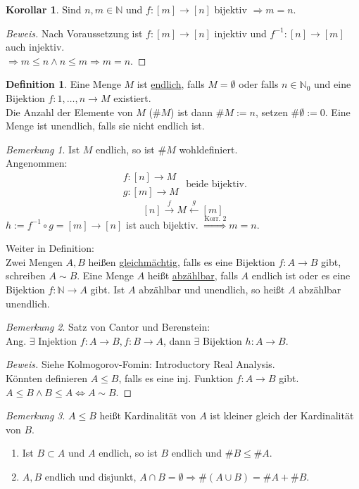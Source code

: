 \documentclass[12pt,a4paper,titlepage]{article} %
\theoremstyle{definition}
\newtheorem{kor}[satz]{Korollar}
\newtheorem{defi}[satz]{Definition}
\theoremstyle{remark}
\newtheorem*{bem}{Bemerkung}
\newenvironment{bew}{\begin{proof}[Beweis]}{\end{proof}}
\begin{document}
\begin{kor}
	Sind $n,m\in\mathbb{N}$ und $f:[m]\rightarrow[n]$ bijektiv $\Rightarrow m=n$.
\end{kor}
\begin{bew}
	Nach Voraussetzung ist $f: [m]\rightarrow[n]$ injektiv und $f^{-1}:[n]\rightarrow[m]$ auch injektiv.\\
	$\Rightarrow m\leq n \wedge n \leq m \Rightarrow m = n$.
\end{bew}
\begin{defi}
	Eine Menge $M$ ist \underline{endlich}, falls $M=\emptyset$ oder falls $n\in\mathbb{N}_0$ und eine Bijektion $f:{1,\ldots,n}\rightarrow M$ existiert.\\
	Die Anzahl der Elemente von $M$ ($\#M$) ist dann $\#M:=n$, setzen $\#\emptyset := 0$. Eine Menge ist unendlich, falls sie nicht endlich ist.
	\begin{bem}
		Ist $M$ endlich, so ist $\#M$ wohldefiniert. \\
		Angenommen: 
		$$\begin{array}{lr}
		f:[n]\rightarrow M\\
		g:[m]\rightarrow M
		\end{array}
		\text{ beide bijektiv.}$$
		$$[n]\overset{f}{\longrightarrow} M \overset{g}{\longleftarrow} [m]$$
		$h:= f^{-1}\circ g = [m]\rightarrow[n]$ ist auch bijektiv. $\overset{\text{Korr. 2}}{\Rightarrow} m=n.$
	\end{bem}
	Weiter in Definition:\\
	Zwei Mengen $A,B$ heißen \underline{gleichmächtig}, falls es eine Bijektion $f: A\rightarrow B$ gibt, schreiben $A\sim B$. Eine Menge $A$ heißt \underline{abzählbar}, falls $A$ endlich ist oder es eine Bijektion $f: \mathbb{N}\rightarrow A$ gibt. Ist $A$ abzählbar und unendlich, so heißt $A$ abzählbar unendlich.
\end{defi}
\begin{bem}
	Satz von Cantor und Berenstein:\\
	Ang. $\exists$ Injektion $f:A\rightarrow B, f:B\rightarrow A$, dann $\exists$ Bijektion $h:A\rightarrow B$.
\end{bem}
\begin{bew}
	Siehe Kolmogorov-Fomin: Introductory Real Analysis.\\
	Könnten definieren $A\leq B$, falls es eine inj. Funktion $f: A\rightarrow B$ gibt.\\
	$A\leq B \wedge B\leq A \Leftrightarrow A\sim B$.
\end{bew}
\begin{bem}
	$A\leq B$ heißt Kardinalität von $A$ ist kleiner gleich der Kardinalität von $B$.
	\begin{enumerate}
		\item Ist $B\subset A$ und $A$ endlich, so ist $B$ endlich und $\#B \leq \# A$.
		\item $A,B$ endlich und disjunkt, $A\cap B = \emptyset \Rightarrow \#(A\cup B) = \#A + \#B$.
	\end{enumerate}
\end{bem}
\end{document}
